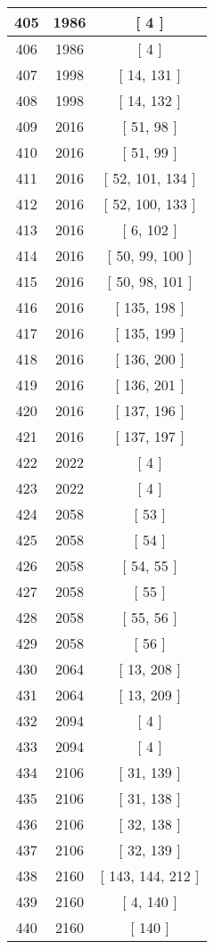 \begin{center}
\begin{longtable}[H]{|| c c c ||}
405 & 1986 & [ 4 ]
\\\hline
406 & 1986 & [ 4 ]
\\\hline
407 & 1998 & [ 14, 131 ]
\\\hline
408 & 1998 & [ 14, 132 ]
\\\hline
409 & 2016 & [ 51, 98 ]
\\\hline
410 & 2016 & [ 51, 99 ]
\\\hline
411 & 2016 & [ 52, 101, 134 ]
\\\hline
412 & 2016 & [ 52, 100, 133 ]
\\\hline
413 & 2016 & [ 6, 102 ]
\\\hline
414 & 2016 & [ 50, 99, 100 ]
\\\hline
415 & 2016 & [ 50, 98, 101 ]
\\\hline
416 & 2016 & [ 135, 198 ]
\\\hline
417 & 2016 & [ 135, 199 ]
\\\hline
418 & 2016 & [ 136, 200 ]
\\\hline
419 & 2016 & [ 136, 201 ]
\\\hline
420 & 2016 & [ 137, 196 ]
\\\hline
421 & 2016 & [ 137, 197 ]
\\\hline
422 & 2022 & [ 4 ]
\\\hline
423 & 2022 & [ 4 ]
\\\hline
424 & 2058 & [ 53 ]
\\\hline
425 & 2058 & [ 54 ]
\\\hline
426 & 2058 & [ 54, 55 ]
\\\hline
427 & 2058 & [ 55 ]
\\\hline
428 & 2058 & [ 55, 56 ]
\\\hline
429 & 2058 & [ 56 ]
\\\hline
430 & 2064 & [ 13, 208 ]
\\\hline
431 & 2064 & [ 13, 209 ]
\\\hline
432 & 2094 & [ 4 ]
\\\hline
433 & 2094 & [ 4 ]
\\\hline
434 & 2106 & [ 31, 139 ]
\\\hline
435 & 2106 & [ 31, 138 ]
\\\hline
436 & 2106 & [ 32, 138 ]
\\\hline
437 & 2106 & [ 32, 139 ]
\\\hline
438 & 2160 & [ 143, 144, 212 ]
\\\hline
439 & 2160 & [ 4, 140 ]
\\\hline
440 & 2160 & [ 140 ]
\\\hline

\end{longtable}
\end{center}
